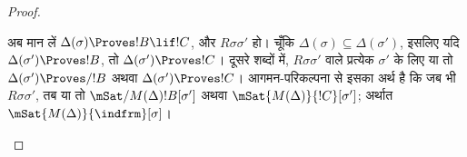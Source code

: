 \documentclass[../../../include/open-logic-section]{subfiles}
\begin{document}
\begin{proof}
\begin{enumerate}
{        अब मान लें $\Delta(\sigma) \Proves !B \lif !C$, और
        $R\sigma\sigma'$ हो। चूँकि
        $\Delta(\sigma) \subseteq \Delta(\sigma')$, इसलिए यदि
        $\Delta(\sigma') \Proves !B$, तो
        $\Delta(\sigma') \Proves !C$। दूसरे शब्दों में, $R\sigma\sigma'$
        वाले प्रत्येक $\sigma'$ के लिए या तो
        $\Delta(\sigma') \Proves/ !B$ अथवा
        $\Delta(\sigma') \Proves !C$। आगमन-परिकल्पना से इसका अर्थ है कि
        जब भी $R\sigma\sigma'$, तब या तो
        $\mSat/{M(\Delta)}{!B}[\sigma']$ अथवा
        $\mSat{M(\Delta)}{!C}[\sigma']$; अर्थात
        $\mSat{M(\Delta)}{\indfrm}[\sigma]$।}
  \end{enumerate}
\end{proof}
\end{document}
